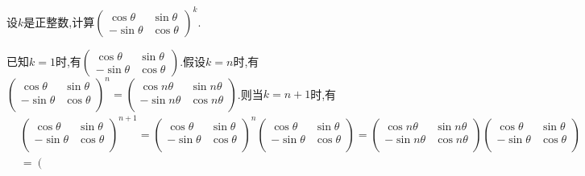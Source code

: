 \documentclass[lang=cn,newtx,10pt,scheme=chinese]{elegantbook}
\begin{document}
\begin{exercise}
设\(k\)是正整数,计算\(\begin{pmatrix}
\cos\theta & \sin\theta\\
-\sin\theta & \cos\theta
\end{pmatrix}^k\).
\end{exercise}
\begin{solution}
已知$k=1$时,有\(\begin{pmatrix}
\cos\theta & \sin\theta\\
-\sin\theta & \cos\theta
\end{pmatrix}\).假设$k=n$时,有$\left( \begin{matrix}
\cos \theta&		\sin \theta\\
-\sin \theta&		\cos \theta\\
\end{matrix} \right) ^n=\left( \begin{matrix}
\cos n\theta&		\sin n\theta\\
-\sin n\theta&		\cos n\theta\\
\end{matrix} \right) $.则当$k=n+1$时,有
\begin{align*}
&\left( \begin{matrix}
\cos \theta&		\sin \theta\\
-\sin \theta&		\cos \theta\\
\end{matrix} \right) ^{n+1}=\left( \begin{matrix}
\cos \theta&		\sin \theta\\
-\sin \theta&		\cos \theta\\
\end{matrix} \right) ^n\left( \begin{matrix}
\cos \theta&		\sin \theta\\
-\sin \theta&		\cos \theta\\
\end{matrix} \right) =\left( \begin{matrix}
\cos n\theta&		\sin n\theta\\
-\sin n\theta&		\cos n\theta\\
\end{matrix} \right) \left( \begin{matrix}
\cos \theta&		\sin \theta\\
-\sin \theta&		\cos \theta\\
\end{matrix} \right) 
\\
&=\left( \begin{matrix}

\end{matrix}
\end{align*}
\end{solution}
\end{document}
